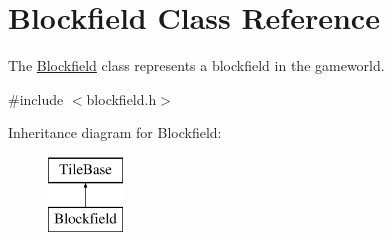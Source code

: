\hypertarget{classBlockfield}{\section{Blockfield Class Reference}
\label{classBlockfield}
}


The \hyperlink{classBlockfield}{Blockfield} class represents a blockfield in the gameworld.  




{\ttfamily \#include $<$blockfield.\-h$>$}

Inheritance diagram for Blockfield\-:\begin{figure}[H]
\begin{center}
\leavevmode
\includegraphics[height=2.000000cm]{classBlockfield}
\end{center}
\end{figure}
